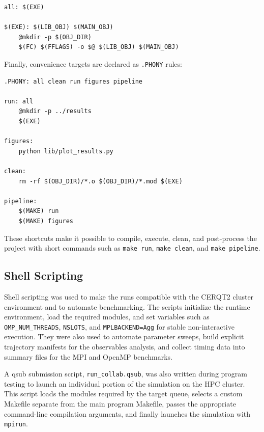 \begin{lstlisting}
all: $(EXE)

$(EXE): $(LIB_OBJ) $(MAIN_OBJ)
    @mkdir -p $(OBJ_DIR)
    $(FC) $(FFLAGS) -o $@ $(LIB_OBJ) $(MAIN_OBJ)
\end{lstlisting}

Finally, convenience targets are declared as \texttt{.PHONY} rules:

\begin{lstlisting}
.PHONY: all clean run figures pipeline

run: all
    @mkdir -p ../results
    $(EXE)

figures:
    python lib/plot_results.py

clean:
    rm -rf $(OBJ_DIR)/*.o $(OBJ_DIR)/*.mod $(EXE)

pipeline:
    $(MAKE) run
    $(MAKE) figures
\end{lstlisting}

These shortcuts make it possible to compile, execute, clean, and post-process the project with short commands such as \texttt{make run}, \texttt{make clean}, and \texttt{make pipeline}.

\subsection{Shell Scripting}\label{shell-scripting}

Shell scripting was used to make the runs compatible with the CERQT2
cluster environment and to automate benchmarking. The scripts
initialize the runtime environment, load the required modules, and set
variables such as \texttt{OMP\_NUM\_THREADS}, \texttt{NSLOTS}, and
\texttt{MPLBACKEND=Agg} for stable non-interactive execution. They were
also used to automate parameter sweeps, build explicit trajectory
manifests for the observables analysis, and collect timing data into
summary files for the MPI and OpenMP benchmarks.

A qsub submission script, \texttt{run\_collab.qsub}, was also written
during program testing to launch an individual portion of the simulation
on the HPC cluster. This script loads the modules required by the target
queue, selects a custom Makefile separate from the main program
Makefile, passes the appropriate command-line compilation arguments, and
finally launches the simulation with \texttt{mpirun}.